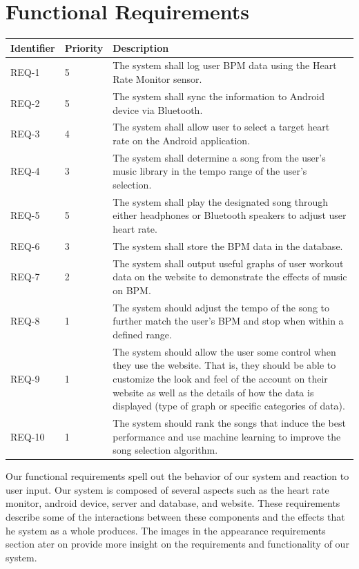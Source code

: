 \documentclass[letterpaper,english, 12pt]{scrreprt}
\begin{document}
\section{Functional Requirements}
\begin{center}
	\begin{tabular}{|C{2cm}|C{2cm}|C{8cm}|}
		\hline
			Identifier & Priority & Description\\
		\hline
			REQ-1 & 5 &  The system shall log user BPM data using the Heart Rate Monitor sensor.\\
		\hline
			REQ-2 & 5 & The system shall sync the information to Android device via Bluetooth.\\
		\hline
			REQ-3 & 4 & The system shall allow user to select a target heart rate on the Android application.\\
		\hline
			REQ-4 & 3 & The system shall determine a song from the user’s music library in the tempo range of the user’s selection.\\
		\hline
			REQ-5 & 5 & The system shall play the designated song through either headphones or Bluetooth speakers to adjust user heart rate.\\
		\hline
			REQ-6 & 3 & The system shall store the BPM data in the database.\\
		\hline
			REQ-7 & 2 & The system shall output useful graphs of user workout data on the website to demonstrate the effects of music on BPM.\\
		\hline
			REQ-8 & 1 & The system should adjust the tempo of the song to further match the user’s BPM and stop when within a defined range.\\
		\hline
			REQ-9 & 1 & The system should allow the user some control when they use the website. That is, they should be able to customize the look and feel of the account on their website as well as the details of how the data is displayed (type of graph or specific categories of data).\\
		\hline
			REQ-10 & 1 & The system should rank the songs that induce the best performance and use machine learning to improve the song selection algorithm.\\
		\hline
	\end{tabular}
\end{center}

Our functional requirements spell out the behavior of our system and reaction to
user input. Our system is composed of several aspects such as the heart rate
monitor, android device, server and database, and website. These requirements
describe some of the interactions between these components and the effects that
he system as a whole produces. The images in the appearance requirements section
ater on provide more insight on the requirements and functionality of our system.
\end{document}
